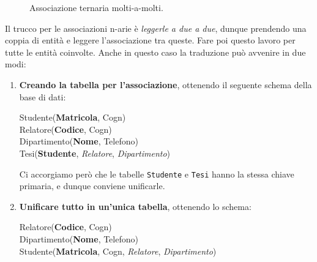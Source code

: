 \documentclass[12pt]{report}
\begin{document}
\begin{figure}[H]
{%
		}
		\caption{Associazione ternaria molti-a-molti.}
	\end{figure}
	
	Il trucco per le associazioni n-arie è \textit{leggerle a due a due}, dunque prendendo una coppia di entità e leggere l'associazione tra queste. Fare poi questo lavoro per tutte le entità coinvolte.
	Anche in questo caso la traduzione può avvenire in due modi:
	\begin{enumerate}
		\item \textbf{Creando la tabella per l'associazione}, ottenendo il seguente schema della base di dati:
		\begin{center}
			Studente(\textbf{Matricola}, Cogn)\\
			Relatore(\textbf{Codice}, Cogn)\\
			Dipartimento(\textbf{Nome}, Telefono)\\
			Tesi(\textbf{Studente}, \textit{Relatore}, \textit{Dipartimento})
		\end{center}
		Ci accorgiamo però che le tabelle \texttt{Studente} e \texttt{Tesi} hanno la stessa chiave primaria, e dunque conviene unificarle.
		
		\item \textbf{Unificare tutto in un'unica tabella}, ottenendo lo schema:
		\begin{center}
			Relatore(\textbf{Codice}, Cogn)\\
			Dipartimento(\textbf{Nome}, Telefono)\\
			Studente(\textbf{Matricola}, Cogn, \textit{Relatore}, \textit{Dipartimento})
		\end{center}
	\end{enumerate}
	
\end{document}
